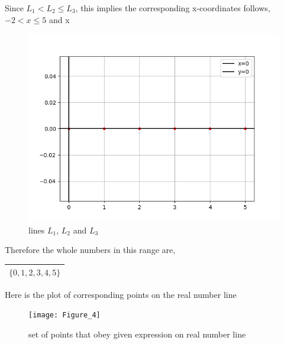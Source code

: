 \documentclass[16pt, a4paper, two column]{article}
\begin{document}
Since $L_1 < L_2 \le L_3$, this implies the corresponding x-coordinates follows, $-2< x \le 5$  and x\in {}\newline


\begin{figure}[h]
    \includegraphics[width=\columnwidth]{Figure_3}
    \caption{lines $L_1$, $L_2$ and $L_3$}
    
\end{figure}






\noindent Therefore the whole numbers in this range are,

\begin{center}
\begin{tabular}{|c|}
\hline
\textbf{$ \{  0, 1, 2, 3, 4,5\}$} \\
\hline
\end{tabular}
\end{center}


\noindent Here is the plot of corresponding points on the real number line\\
\begin{figure}[h]
    \texttt{[image: Figure\_4]}
    \caption{set of points that obey given expression on real number line}
    \label{fig:mesh1}
\end{figure}
\end{document}
